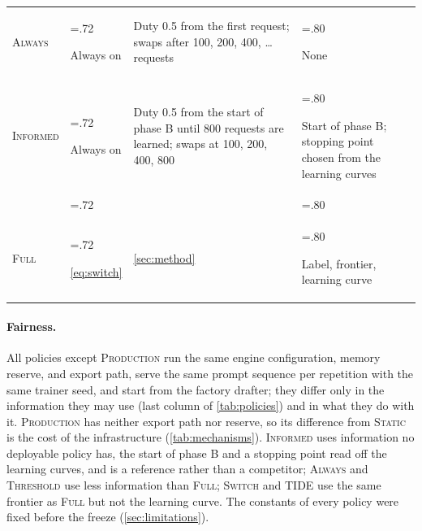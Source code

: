 \documentclass{article}
\newcommand{\pol}[1]{\textsc{#1}}
\begin{document}
\begin{table}[!htbp]
\begin{tabularx}{\linewidth}{@{}
    l
    >{\hsize=.72\hsize\raggedright\arraybackslash}X
    >{\hsize=1.48\hsize\raggedright\arraybackslash}X
    >{\hsize=.80\hsize\raggedright\arraybackslash}X
    @{}}
\pol{Always}
& Always on
& Duty 0.5 from the first request;
  swaps after 100, 200, 400,
  \dots{} requests
& None \\

\cellcolor{tabOracle}\pol{Informed}
& Always on
& Duty 0.5 from the start of phase B
  until 800 requests are learned;
  swaps at 100, 200, 400, 800
& Start of phase B; stopping point
  chosen from the learning curves \\

\addlinespace[3pt]

\rowcolor{tabGroup}
\multicolumn{4}{@{}l@{}}{
  \textbf{\footnotesize Proposed Method}
} \\

\rowcolor{tabFull}
\pol{Full}
& \cref{eq:switch}
& \cref{sec:method}
& Label, frontier, learning curve \\

\bottomrule
\end{tabularx}
\endgroup
\end{table}


\paragraph{Fairness.} All policies except \pol{Production} run the same engine configuration, memory reserve, and export path, serve the same prompt sequence per repetition with the same trainer seed, and start from the factory drafter; they differ only in the information they may use (last column of \cref{tab:policies}) and in what they do with it. \pol{Production} has neither export path nor reserve, so its difference from \pol{Static} is the cost of the infrastructure (\cref{tab:mechanisms}). \pol{Informed} uses information no deployable policy has, the start of phase B and a stopping point read off the learning curves, and is a reference rather than a competitor; \pol{Always} and \pol{Threshold} use less information than \pol{Full}; \pol{Switch} and \pol{TIDE} use the same frontier as \pol{Full} but not the learning curve. The constants of every policy were fixed before the freeze (\cref{sec:limitations}).
\end{document}
